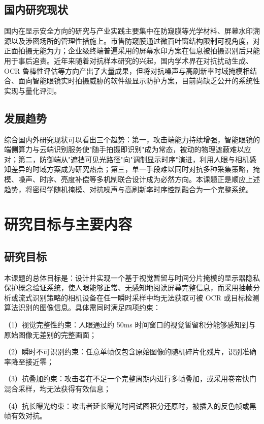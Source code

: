 \subsection{国内研究现状}

国内在显示安全方向的研究与产业实践主要集中在防窥膜等光学材料、屏幕水印溯源以及涉密场所的管理性措施上。市售防窥膜通过微百叶窗结构限制可视角度，对正面拍摄无能为力；企业级终端普遍采用的屏幕水印方案在信息被拍摄识别后只能用于事后追责。近年来随着对抗样本研究的兴起，国内学术界在对抗扰动生成、OCR 鲁棒性评估等方向产出了大量成果，但将对抗噪声与高刷新率时域掩模相结合、面向智能眼镜实时拍摄威胁的软件级显示防护方案，目前尚缺乏公开的系统性实现与量化评测。

\subsection{发展趋势}

综合国内外研究现状可以看出三个趋势：第一，攻击端能力持续增强，智能眼镜的端侧算力与云端识别服务使"随手拍摄即识别"成为常态，被动的物理遮蔽难以应对；第二，防御端从"遮挡可见光路径"向"调制显示时序"演进，利用人眼与相机感知差异的时域方案成为研究热点；第三，单一手段难以同时对抗多种采集策略，掩模、噪声、时序、亮度补偿等多机制联合设计成为必然方向。本课题正是顺应上述趋势，将密码学随机掩模、对抗噪声与高刷新率时序控制融合为一个完整系统。

\section{研究目标与主要内容}

\subsection{研究目标}

本课题的总体目标是：设计并实现一个基于视觉暂留与时间分片掩模的显示器隐私保护概念验证系统，使人眼能够正常、无感知地阅读屏幕完整信息，而采用抽帧分析或流式识别策略的相机设备在任一瞬时采样中均无法获取可被 OCR 或目标检测算法识别的图像信息。具体需同时满足四项约束：

（1）视觉完整性约束：人眼通过约 50ms 时间窗口的视觉暂留积分能够感知到与原始图像无差别的完整画面；

（2）瞬时不可识别约束：任意单帧仅包含原始图像的随机碎片化残片，识别准确率降至接近零；

（3）抗叠加约束：攻击者在不足一个完整周期内进行多帧叠加，或采用卷帘快门混合采样，均无法获得有效信息；

（4）抗长曝光约束：攻击者延长曝光时间试图积分还原时，被插入的反色帧或黑帧有效对抗。

